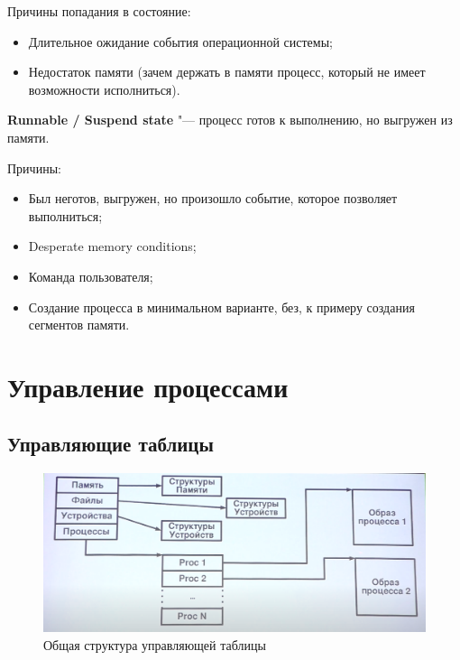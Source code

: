 \documentclass[bachelor, och, book]{SCWorks}
\theoremstyle{remark}
\begin{document}
    Причины попадания в состояние:

    \begin{itemize}[label=$\bullet$]
        \item Длительное ожидание события операционной системы;
        \item Недостаток памяти (зачем держать в памяти процесс, который не имеет возможности исполниться).
    \end{itemize}

    \hfill \break
    \textbf{Runnable / Suspend state} "--- процесс готов к выполнению, но выгружен из памяти.

    Причины:

    \begin{itemize}[label=$\bullet$]
        \item Был неготов, выгружен, но произошло событие, которое позволяет выполниться;
        \item Desperate memory conditions;
        \item Команда пользователя;
        \item Создание процесса в минимальном варианте, без, к примеру создания сегментов памяти.
    \end{itemize}

    \section{Управление процессами}

    \subsection{Управляющие таблицы}
    
    \begin{figure}[H]
        \begin{center}
            \includegraphics[scale=0.4]{res/general-structure-of-control-table.png}
            \caption{Общая структура управляющей таблицы}
        \end{center}
    \end{figure}
\end{document}
